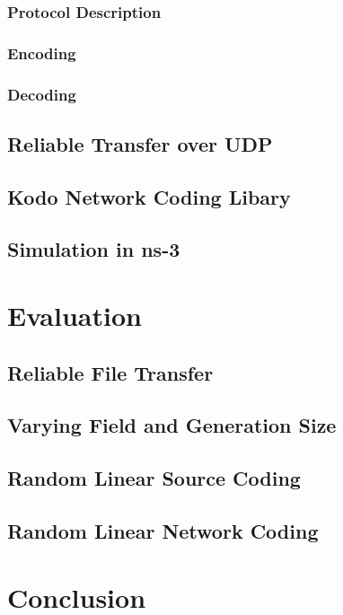 \documentclass[12pt,a4paper,twoside,openright]{report}
\begin{document}
\subsection{Protocol Description}
\subsection{Encoding}
\subsection{Decoding}

\section{Reliable Transfer over UDP}

\section{Kodo Network Coding Libary}

\section{Simulation in ns-3} \label{sec:ns3}

\chapter{Evaluation} \label{ch:eval}

\section{Reliable File Transfer} \label{sec:relUDP}

\section{Varying Field and Generation Size} \label{sec:fieldgen}

\section{Random Linear Source Coding} \label{sec:rlsc}

\section{Random Linear Network Coding} \label{sec:rlnc}

\chapter{Conclusion} \label{ch:conc}
\end{document}
